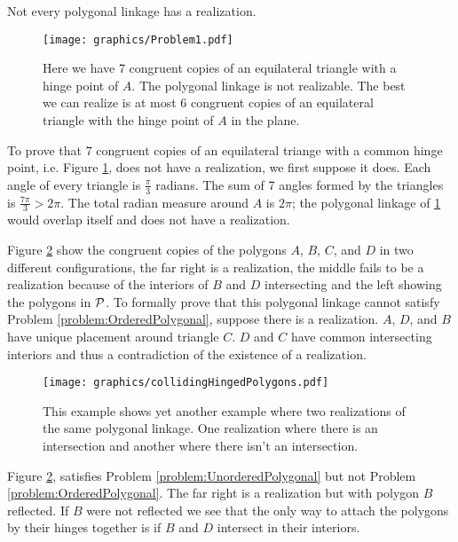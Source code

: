 Not every polygonal linkage has a realization.
\begin{figure}[!htbp]
\begin{center}
\texttt{[image: graphics/Problem1.pdf]}
\end{center} 
\caption{Here we have 7 congruent copies of an equilateral triangle with a hinge point of $A$.  The polygonal linkage is not realizable.  The best we can realize is at most 6 congruent copies of an equilateral triangle with the hinge point of $A$ in the plane.}
\label{fig:problem1}
\end{figure}
To prove that 7 congruent copies of an equilateral triange with a common hinge point, i.e. Figure \ref{fig:problem1}, does not have a realization, we first suppose it does.  Each angle of every triangle is $\frac{\pi}{3}$ radians.  The sum of 7 angles formed by the triangles is $\frac{7\pi}{3}>2\pi$.  The total radian measure around $A$ is $2 \pi$; the polygonal linkage of \ref{fig:problem1} would overlap itself and does not have a realization.

Figure \ref{fig:collidingHingedPolygons} show the congruent copies of the polygons $A$, $B$, $C$, and $D$ in two different configurations, the far right is a realization, the middle fails to be a realization because of the interiors of $B$ and $D$ intersecting and the left showing the polygons in ${\cal P}$.  To formally prove that this polygonal linkage cannot satisfy Problem \ref{problem:OrderedPolygonal}, suppose there is a realization.  $A$, $D$, and $B$ have unique placement around triangle $C$.  $D$ and $C$ have common intersecting interiors and thus a contradiction of the existence of a realization.  
\begin{figure}[!htbp]\label{fig:collidingHingedPolygons}
\begin{center}
\texttt{[image: graphics/collidingHingedPolygons.pdf]}
\end{center} 
\caption{This example shows yet another example where two realizations of the same polygonal linkage.  One realization where there is an intersection and another where there isn't an intersection.}
\end{figure}
Figure \ref{fig:collidingHingedPolygons}, satisfies Problem \ref{problem:UnorderedPolygonal} but not Problem \ref{problem:OrderedPolygonal}.  The far right is a realization but with polygon $B$ reflected. If $B$ were not reflected we see that the only way to attach the polygons by their hinges together is if $B$ and $D$ intersect in their interiors.  

